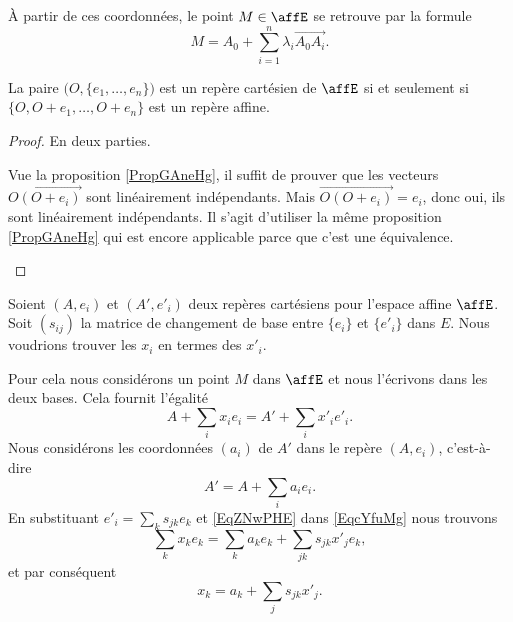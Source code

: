 À partir de ces coordonnées, le point \( M\in\affE\) se retrouve par la formule
\begin{equation}
	M=A_0+\sum_{i=1}^n\lambda_i\overrightarrow{ A_0A_i }.
\end{equation}

\begin{proposition}      \label{PROPooIXVBooPpKsDE}
	La paire \( \big( O,\{ e_1,\ldots, e_n \} \big)\) est un repère cartésien de \( \affE\) si et seulement si \( \{ O,O+e_1,\ldots, O+e_n \}\) est un repère affine.
\end{proposition}

\begin{proof}
	En deux parties.
	\begin{subproof}
		Vue la proposition \ref{PropGAneHg}, il suffit de prouver que les vecteurs \( \overrightarrow{O(O+e_i)}\) sont linéairement indépendants. Mais \( \overrightarrow{O(O+e_i)}=e_i\), donc oui, ils sont linéairement indépendants.
		Il s'agit d'utiliser la même proposition \ref{PropGAneHg} qui est encore applicable parce que c'est une équivalence.
	\end{subproof}
\end{proof}

\begin{normaltext}
	Soient \( (A,e_i)\) et \( (A',e'_i)\) deux repères cartésiens pour l'espace affine \( \affE\). Soit \( (s_{ij})\) la matrice de changement de base entre \( \{ e_i \}\) et \( \{ e'_i \}\) dans \( E\). Nous voudrions trouver les \( x_i\) en termes des \( x'_i\).

	Pour cela nous considérons un point \( M\) dans \( \affE\) et nous l'écrivons dans les deux bases. Cela fournit l'égalité
	\begin{equation}        \label{EqcYfuMg}
		A+\sum_ix_ie_i=A'+\sum_ix'_ie'_i.
	\end{equation}
	Nous considérons les coordonnées \( (a_i)\) de \( A'\) dans le repère \( (A,e_i)\), c'est-à-dire
	\begin{equation}    \label{EqZNwPHE}
		A'=A+\sum_ia_ie_i.
	\end{equation}
	En substituant \( e'_i=\sum_ks_{jk}e_k\) et \eqref{EqZNwPHE} dans \eqref{EqcYfuMg} nous trouvons
	\begin{equation}
		\sum_kx_ke_k=\sum_ka_ke_k+\sum_{jk}s_{jk}x'_je_k,
	\end{equation}
	et par conséquent
	\begin{equation}
		x_k=a_k+\sum_js_{jk}x'_j.
	\end{equation}
\end{normaltext}

